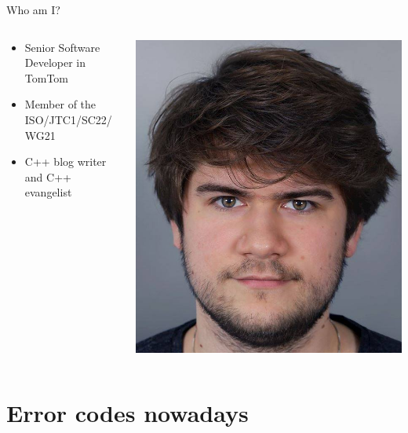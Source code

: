 \documentclass[10pt]{beamer}
\begin{document}
\begin{frame}{Who am I?}
	\begin{columns}[onlytextwidth]
		\begin{column}{0.7\textwidth}
			\begin{itemize}
				\item Senior Software Developer in TomTom
				\item Member of the ISO/JTC1/SC22/WG21
				\item C++ blog writer and C++ evangelist
			\end{itemize}
		\end{column}
		\begin{column}{0.29\textwidth}
			\includegraphics[width=\linewidth]{Dawid_Pilarski.jpg}
		\end{column}	
	\end{columns}
\end{frame}

\section{Error codes nowadays}
\end{document}
